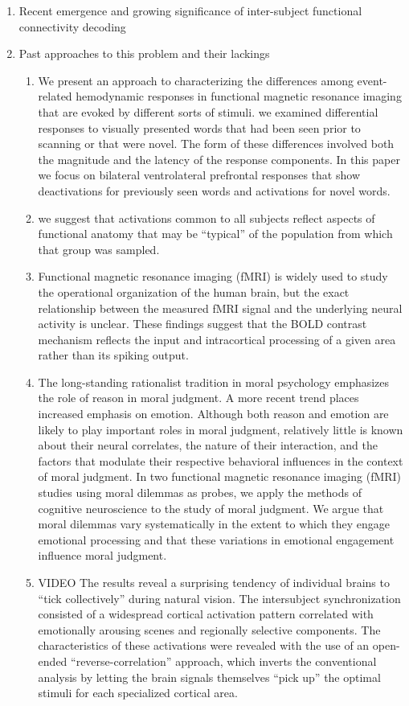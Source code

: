 \documentclass[12pt]{article}
\begin{document}
\begin{enumerate}
\item Recent emergence and growing significance of inter-subject functional connectivity decoding
\item Past approaches to this problem and their lackings
\begin{enumerate}
\item \cite{Friston98} We present an approach to characterizing the differences among event-related hemodynamic responses in functional magnetic resonance imaging that are evoked by different sorts of stimuli. we examined differential responses to visually presented words that had been seen prior to scanning or that were novel. The form of these differences involved both the magnitude and the latency of the response components. In this paper we focus on bilateral ventrolateral prefrontal responses that show deactivations for previously seen words and activations for novel words.
\item \cite{Friston99} we suggest that activations common to all subjects reflect aspects of functional anatomy that may be “typical” of the population from which that group was sampled.
\item \cite{Logothetis01} Functional magnetic resonance imaging (fMRI) is widely used to study the operational organization of the human brain, but the exact relationship between the measured fMRI signal and the underlying neural activity is unclear. These findings suggest that the BOLD contrast mechanism reflects the input and intracortical processing of a given area rather than its spiking output.
\item \cite{Greene01} The long-standing rationalist tradition in moral psychology emphasizes the role of reason in moral judgment. A more recent trend places increased emphasis on emotion. Although both reason and emotion are likely to play important roles in moral judgment, relatively little is known about their neural correlates, the nature of their interaction, and the factors that modulate their respective behavioral influences in the context of moral judgment. In two functional magnetic resonance imaging (fMRI) studies using moral dilemmas as probes, we apply the methods of cognitive neuroscience to the study of moral judgment. We argue that moral dilemmas vary systematically in the extent to which they engage emotional processing and that these variations in emotional engagement influence moral judgment.
\item \cite{hasson2004} VIDEO The results reveal a surprising tendency of individual brains to “tick collectively” during natural vision. The intersubject synchronization consisted of a widespread cortical activation pattern correlated with emotionally arousing scenes and regionally selective components. The characteristics of these activations were revealed with the use of an open-ended “reverse-correlation” approach, which inverts the conventional analysis by letting the brain signals themselves “pick up” the optimal stimuli for each specialized cortical area.

\end{enumerate}
\end{enumerate}
\end{document}
